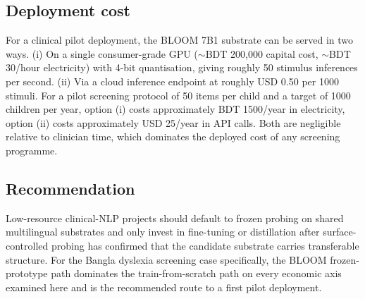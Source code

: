 \subsection*{Deployment cost}

For a clinical pilot deployment, the BLOOM 7B1 substrate can be served in two ways. (i) On a single consumer-grade GPU ($\sim$BDT 200{,}000 capital cost, $\sim$BDT 30/hour electricity) with 4-bit quantisation, giving roughly 50 stimulus inferences per second. (ii) Via a cloud inference endpoint at roughly USD 0.50 per 1000 stimuli. For a pilot screening protocol of 50 items per child and a target of 1000 children per year, option (i) costs approximately BDT 1500/year in electricity, option (ii) costs approximately USD 25/year in API calls. Both are negligible relative to clinician time, which dominates the deployed cost of any screening programme.

\subsection*{Recommendation}

Low-resource clinical-NLP projects should default to frozen probing on shared multilingual substrates and only invest in fine-tuning or distillation after surface-controlled probing has confirmed that the candidate substrate carries transferable structure. For the Bangla dyslexia screening case specifically, the BLOOM frozen-prototype path dominates the train-from-scratch path on every economic axis examined here and is the recommended route to a first pilot deployment.